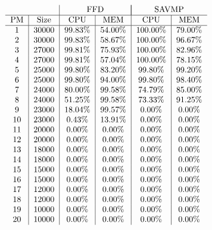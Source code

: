 \documentclass[10pt, conference, compsocconf]{IEEEtran}
\begin{document}
\begin{table}[h]
\caption{PM resource utilization Comparison between placement by FFD and SAVMP
on 200 VMs with capacity index = 10}
\begin{center}
$\begin{tabular}{c|c|c|c|c|c}
\multicolumn{2}{c|}{}& \multicolumn{2}{c|}{FFD}&\multicolumn{2}{|c}{SAVMP} \\
\hline
PM & Size & CPU & MEM & CPU & MEM\\
\hline
1 & 30000 & 99.83\% & 54.00\% & 100.00\% & 79.00\%\\
2 & 30000 & 99.83\% & 58.67\% & 100.00\% & 96.67\%\\
3 & 27000 & 99.81\% & 75.93\% & 100.00\% & 82.96\%\\
4 & 27000 & 99.81\% & 57.04\% & 100.00\% & 78.15\%\\
5 & 25000 & 99.80\% & 83.20\% & 99.80\% & 99.20\%\\
6 & 25000 & 99.80\% & 94.00\% & 99.80\% & 98.40\%\\
7 & 24000 & 80.00\% & 99.58\% & 74.79\% & 85.00\%\\
8 & 24000 & 51.25\% & 99.58\% & 73.33\% & 91.25\%\\
9 & 23000 & 18.04\% & 99.57\% & 0.00\% & 0.00\%\\
10 & 23000 & 0.43\% & 13.91\% & 0.00\% & 0.00\%\\
11 & 20000 & 0.00\% & 0.00\% & 0.00\% & 0.00\%\\
12 & 20000 & 0.00\% & 0.00\% & 0.00\% & 0.00\%\\
13 & 18000 & 0.00\% & 0.00\% & 0.00\% & 0.00\%\\
14 & 18000 & 0.00\% & 0.00\% & 0.00\% & 0.00\%\\
15 & 15000 & 0.00\% & 0.00\% & 0.00\% & 0.00\%\\
16 & 15000 & 0.00\% & 0.00\% & 0.00\% & 0.00\%\\
17 & 12000 & 0.00\% & 0.00\% & 0.00\% & 0.00\%\\
18 & 12000 & 0.00\% & 0.00\% & 0.00\% & 0.00\%\\
19 & 10000 & 0.00\% & 0.00\% & 0.00\% & 0.00\%\\
20 & 10000 & 0.00\% & 0.00\% & 0.00\% & 0.00\%
\end{tabular}$

\end{center}
\end{table}
  
                 
\end{document}
